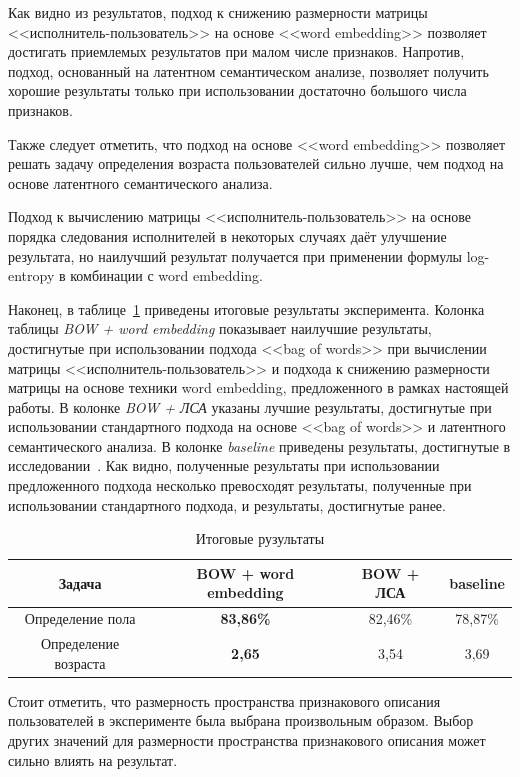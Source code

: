 Как видно из результатов, подход к снижению размерности
матрицы <<исполнитель-пользователь>> на основе <<word embedding>>
позволяет достигать приемлемых результатов при малом числе признаков.
Напротив, подход, основанный на латентном семантическом анализе,
позволяет получить хорошие результаты только при использовании
достаточно большого числа признаков.

Также следует отметить, что подход на основе <<word embedding>>
позволяет решать задачу определения возраста пользователей сильно
лучше, чем подход на основе латентного семантического анализа.

Подход к вычислению матрицы <<исполнитель-пользователь>> на
основе порядка следования исполнителей в некоторых случаях
даёт улучшение результата, но наилучший результат получается
при применении формулы log-entropy в комбинации с word embedding.

Наконец, в таблице~\ref{tab:total_results} приведены итоговые
результаты эксперимента. Колонка таблицы \textit{BOW + word embedding}
показывает наилучшие результаты, достигнутые при использовании
подхода <<bag of words>> при вычислении матрицы <<исполнитель-пользователь>>
и подхода к снижению размерности матрицы на основе техники
word embedding, предложенного в рамках настоящей работы. В колонке
\textit{BOW + ЛСА} указаны лучшие результаты, достигнутые при
использовании стандартного подхода на основе <<bag of words>>
и латентного семантического анализа. В колонке \textit{baseline}
приведены результаты, достигнутые в исследовании~\cite{wu2014gender}.
Как видно, полученные результаты при использовании предложенного подхода
несколько превосходят результаты, полученные при использовании
стандартного подхода, и результаты, достигнутые ранее.

\begin{table}[!h]
    \caption{Итоговые рузультаты}
    \label{tab:total_results}
\centering
\begin{tabular}{|c|c|c|c|}\hline
    \textbf{Задача} & \textbf{BOW + word embedding} & \textbf{BOW + ЛСА} & \textbf{baseline} \\\hline
    Определение пола & \textbf{83,86\%} & 82,46\% & 78,87\% \\\hline
    Определение возраста & \textbf{2,65} & 3,54 & 3,69 \\\hline
\end{tabular}
\end{table}

Стоит отметить, что размерность пространства признакового описания
пользователей в эксперименте была выбрана произвольным образом. Выбор
других значений для размерности пространства признакового
описания может сильно влиять на результат.

